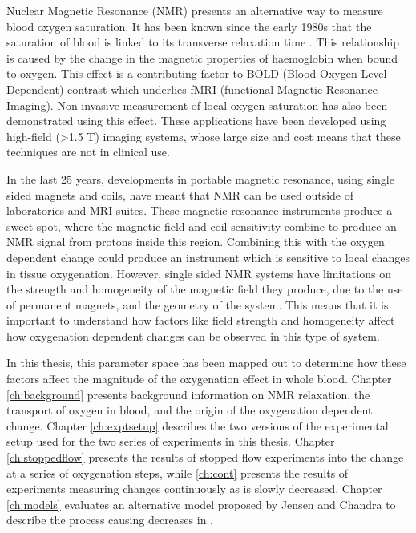 Nuclear Magnetic Resonance (NMR) presents an alternative way to measure blood oxygen saturation.
It has been known since the early 1980s that the saturation of blood is linked to its transverse relaxation time \Ttwo.
This relationship is caused by the change in the magnetic properties of haemoglobin when bound to oxygen.
This effect is a contributing factor to BOLD (Blood Oxygen Level Dependent) contrast which underlies fMRI (functional Magnetic Resonance Imaging).
Non-invasive measurement of local oxygen saturation has also been demonstrated using this effect.
These applications have been developed using high-field (>1.5 T) imaging systems, whose large size and cost means that these techniques are not in clinical use.

In the last 25 years, developments in portable magnetic resonance, using single sided magnets and coils, have meant that NMR can be used outside of laboratories and MRI suites.
These magnetic resonance instruments produce a sweet spot, where the magnetic field and coil sensitivity combine to produce an NMR signal from protons inside this region.
Combining this with the oxygen dependent \Ttwo change could produce an instrument which is sensitive to local changes in tissue oxygenation.
However, single sided NMR systems have limitations on the strength and homogeneity of the magnetic field they produce, due to the use of permanent magnets, and the geometry of the system.
This means that it is important to understand how factors like field strength and homogeneity affect how oxygenation dependent \Ttwo changes can be observed in this type of system.


In this thesis, this parameter space has been mapped out to determine how these factors affect the magnitude of the oxygenation \Ttwo effect in whole blood.
Chapter \ref{ch:background} presents background information on NMR relaxation, the transport of oxygen in blood, and the origin of the oxygenation dependent \Ttwo change.
Chapter \ref{ch:exptsetup} describes the two versions of the experimental setup used for the two series of experiments in this thesis.
Chapter \ref{ch:stoppedflow} presents the results of stopped flow experiments into the \Ttwo change at a series of oxygenation steps, while \autoref{ch:cont} presents the results of experiments measuring \Ttwo changes continuously as \SOtwo is slowly decreased.
Chapter \ref{ch:models} evaluates an alternative model proposed by Jensen and Chandra to describe the process causing decreases in \Ttwo.
